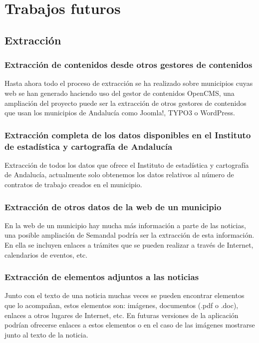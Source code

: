 \section{Trabajos futuros}

\subsection{Extracción}

\subsubsection{Extracción de contenidos desde otros gestores de contenidos}

Hasta ahora todo el proceso de extracción se ha realizado sobre municipios cuyas web se han generado haciendo uso del gestor de contenidos OpenCMS, una ampliación del proyecto puede ser la extracción de otros gestores de contenidos que usan los municipios de Andalucía como Joomla!, TYPO3 o WordPress.

\subsubsection{Extracción completa de los datos disponibles en el Instituto de estadística y cartografía de Andalucía}

Extracción de todos los datos que ofrece el Instituto de estadística y cartografía de Andalucía, actualmente solo obtenemos los datos relativos al número de contratos de trabajo creados en el municipio.

\subsubsection{Extracción de otros datos de la web de un municipio}

En la web de un municipio hay mucha más información a parte de las noticias, una posible ampliación de Semandal podría ser la extracción de esta información. En ella se incluyen enlaces a trámites que se pueden realizar a través de Internet, calendarios de eventos, etc.

\subsubsection{Extracción de elementos adjuntos a las noticias}

Junto con el texto de una noticia muchas veces se pueden encontrar elementos que lo acompañan, estos elementos son: imágenes, documentos (.pdf o .doc), enlaces a otros lugares de Internet, etc. En futuras versiones de la aplicación podrían ofrecerse enlaces a estos elementos o en el caso de las imágenes mostrarse junto al texto de la noticia.

